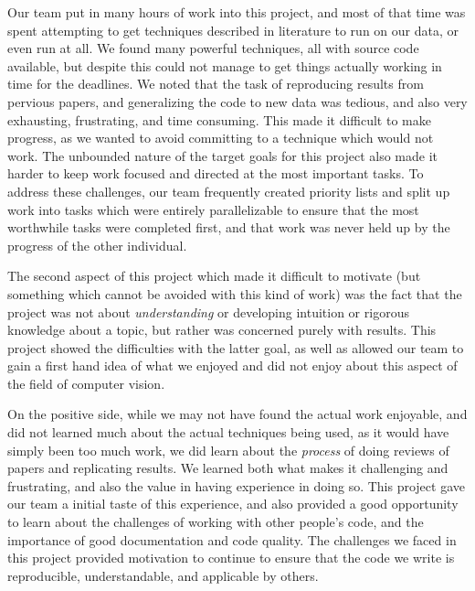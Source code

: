 Our team put in many hours of work into this project, and most of that time was spent attempting to get techniques described in literature to run on our data, or even run at all. We found many powerful techniques, all with source code available, but despite this could not manage to get things actually working in time for the deadlines. We noted that the task of reproducing results from pervious papers, and generalizing the code to new data was tedious, and also very exhausting, frustrating, and time consuming. This made it difficult to make progress, as we wanted to avoid committing to a technique which would not work. The unbounded nature of the target goals for this project also made it harder to keep work focused and directed at the most important tasks. To address these challenges, our team frequently created priority lists and split up work into tasks which were entirely parallelizable to ensure that the most worthwhile tasks were completed first, and that work was never held up by the progress of the other individual.

The second aspect of this project which made it difficult to motivate (but something which cannot be avoided with this kind of work) was the fact that the project was not about \emph{understanding} or developing intuition or rigorous knowledge about a topic, but rather was concerned purely with results. This project showed the difficulties with the latter goal, as well as allowed our team to gain a first hand idea of what we enjoyed and did not enjoy about this aspect of the field of computer vision.

On the positive side, while we may not have found the actual work enjoyable, and did not learned much about the actual techniques being used, as it would have simply been too much work, we did learn about the \emph{process} of doing reviews of papers and replicating results. We learned both what makes it challenging and frustrating, and also the value in having experience in doing so. This project gave our team a initial taste of this experience, and also provided a good opportunity to learn about the challenges of working with other people's code, and the importance of good documentation and code quality. The challenges we faced in this project provided motivation to continue to ensure that the code we write is reproducible, understandable, and applicable by others.